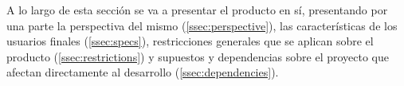 A lo largo de esta sección se va a presentar el producto en sí, presentando por una
parte la perspectiva del mismo (\ref{ssec:perspective}), las características de
los usuarios finales (\ref{ssec:specs}), restricciones generales que se aplican sobre
el producto (\ref{ssec:restrictions}) y supuestos y dependencias sobre el proyecto
que afectan directamente al desarrollo (\ref{ssec:dependencies}).